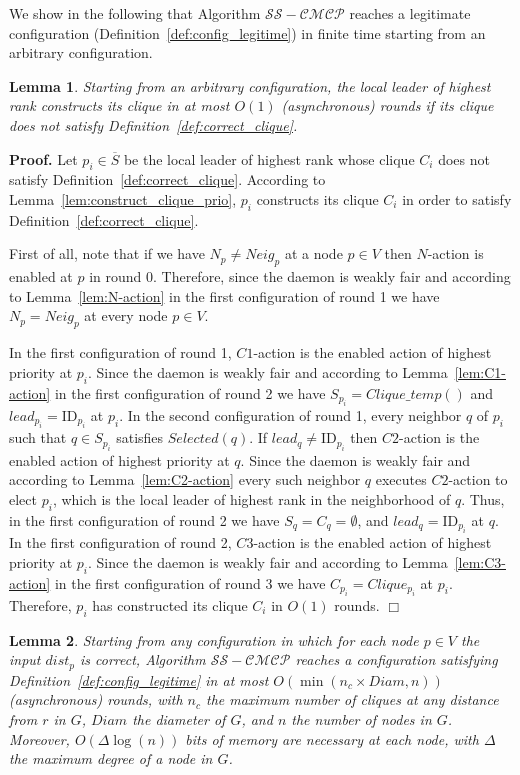 \documentclass[11pt,letterpaper,onecolumn]{article}
\newtheorem{lemma}{Lemma}
\newenvironment{proof}{\noindent \begin{rm}{\textbf{Proof.} }}{\hspace*{\fill}$\Box$\par\end{rm} \vspace{.3cm}}
\newcommand{\id}{\mbox{ID}}
\begin{document}
We show in the following that Algorithm $\mathcal{SS-CMCP}$ reaches a legitimate configuration (Definition~\ref{def:config_legitime}) in finite time starting from an arbitrary configuration.

\begin{lemma}
\label{lem:correct_clique_round}
Starting from an arbitrary configuration, the local leader of highest rank constructs its clique in at most $O(1)$ (asynchronous) rounds if its clique does not satisfy Definition~\ref{def:correct_clique}.
\end{lemma}

\begin{proof}
Let $p_i \in \overline{S}$ be the local leader of highest rank whose clique $C_i$ does not satisfy Definition~\ref{def:correct_clique}. According to Lemma~\ref{lem:construct_clique_prio}, $p_i$ constructs its clique $C_i$ in order to satisfy Definition~\ref{def:correct_clique}.

First of all, note that if we have $N_p \neq Neig_p$ at a node $p \in V$ then $N$-action is enabled at $p$ in round 0. Therefore, since the daemon is weakly fair and according to Lemma~\ref{lem:N-action} in the first configuration of round 1 we have $N_p=Neig_p$ at every node $p \in V$.

In the first configuration of round 1, $C1$-action is the enabled action of highest priority at $p_i$. Since the daemon is weakly fair and according to Lemma~\ref{lem:C1-action} in the first configuration of round 2 we have $S_{p_i}=Clique\_temp()$ and $lead_{p_i}=\id_{p_i}$ at $p_i$. In the second configuration of round 1, every neighbor $q$ of $p_i$ such that $q \in S_{p_i}$ satisfies $Selected(q)$. If $lead_q \neq \id_{p_i}$ then $C2$-action is the enabled action of highest priority at $q$. Since the daemon is weakly fair and according to Lemma~\ref{lem:C2-action} every such neighbor $q$ executes $C2$-action to elect $p_i$, which is the local leader of highest rank in the neighborhood of $q$. Thus, in the first configuration of round 2 we have $S_q=C_q=\emptyset$, and $lead_q=\id_{p_i}$ at $q$. In the first configuration of round 2, $C3$-action is the enabled action of highest priority at $p_i$. Since the daemon is weakly fair and according to Lemma~\ref{lem:C3-action} in the first configuration of round 3 we have $C_{p_i}=Clique_{p_i}$ at $p_i$. Therefore, $p_i$ has constructed its clique $C_i$ in $O(1)$ rounds.
\end{proof}

\begin{lemma}
\label{lem:config_legitime_round}
Starting from any configuration in which for each node $p \in V$ the input $dist_p$ is correct, Algorithm $\mathcal{SS-CMCP}$ reaches a configuration satisfying Definition~\ref{def:config_legitime} in at most $O(\min(n_c \times Diam, n))$ (asynchronous) rounds, with $n_c$ the maximum number of cliques at any distance from $r$ in $G$, $Diam$ the diameter of $G$, and $n$ the number of nodes in $G$. Moreover, $O(\Delta \log(n))$ bits of memory are necessary at each node, with $\Delta$ the maximum degree of a node in $G$.
\end{lemma}
\end{document}
